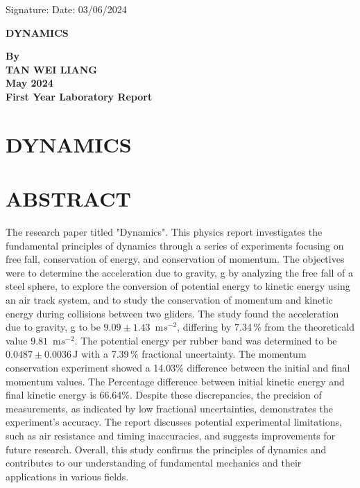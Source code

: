 \documentclass[a4paper,11pt]{article}
\begin{document}
Signature: \hrulefill \hfill Date: 03/06/2024

\newpage
\begin{center}
\vspace*{1cm}
\textbf{\Large DYNAMICS}

\vspace{3.0cm}
\textbf{By}\\

\vspace{3.0cm}
\textbf{TAN WEI LIANG} \\

\vspace{3.0cm}
\textbf{May 2024}\\

\vfill
\textbf{\large First Year Laboratory Report}
\end{center}


\newpage
{}
\section*{\large \center DYNAMICS}
\section*{\large \center ABSTRACT}
\label{sec:ABSTRACT}
The research paper titled "Dynamics". This physics report investigates the fundamental principles of dynamics through a series of experiments focusing on free fall, conservation of energy, and conservation of momentum. The objectives were to determine the acceleration due to gravity, g by analyzing the free fall of a steel sphere, to explore the conversion of potential energy to kinetic energy using an air track system, and to study the conservation of momentum and kinetic energy during collisions between two gliders. The study found the acceleration due to gravity, g to be \(9.09 \pm 1.43 \)\, m$s^{-2}$, differing by 7.34\,\% from the theoreticald value \(9.81\)\, m$s^{-2}$. The potential energy per rubber band was determined to be \(0.0487 \pm 0.0036 \, \text{J}\) with a 7.39\,\% fractional uncertainty. The momentum conservation experiment showed a 14.03\% difference between the initial and final momentum values. The Percentage difference between initial kinetic energy and final kinetic energy is 66.64\%. Despite these discrepancies, the precision of measurements, as indicated by low fractional uncertainties, demonstrates the experiment's accuracy. The report discusses potential experimental limitations, such as air resistance and timing inaccuracies, and suggests improvements for future research. Overall, this study confirms the principles of dynamics and contributes to our understanding of fundamental mechanics and their applications in various fields.
\end{document}
